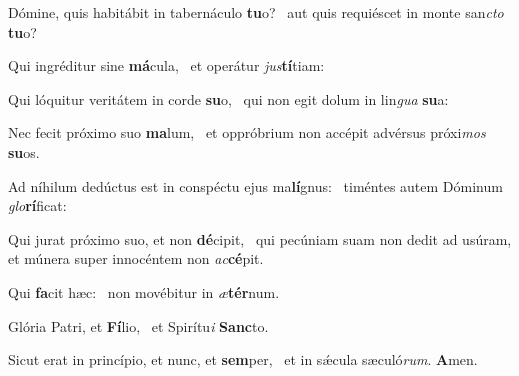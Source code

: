 \item Dómine, quis habitábit in tabernáculo \textbf{tu}o?~\psstar{} aut quis requiéscet in monte san\textit{cto} \textbf{tu}o?
\item Qui ingréditur sine \textbf{má}cula,~\psstar{} et operátur \textit{jus}\textbf{tí}tiam:
\item Qui lóquitur veritátem in corde \textbf{su}o,~\psstar{} qui non egit dolum in lin\textit{gua} \textbf{su}a:
\item Nec fecit próximo suo \textbf{ma}lum,~\psstar{} et oppróbrium non accépit advérsus próxi\textit{mos} \textbf{su}os.
\item Ad níhilum dedúctus est in conspéctu ejus ma\textbf{lí}gnus:~\psstar{} timéntes autem Dóminum \textit{glo}\textbf{rí}ficat:
\item Qui jurat próximo suo, et non \textbf{dé}cipit,~\psstar{} qui pecúniam suam non dedit ad usúram, et múnera super innocéntem non \textit{ac}\textbf{cé}pit.
\item Qui \textbf{fa}cit hæc:~\psstar{} non movébitur in \textit{æ}\textbf{tér}num.
\item Glória Patri, et \textbf{Fí}lio,~\psstar{} et Spirítu\textit{i} \textbf{Sanc}to.
\item Sicut erat in princípio, et nunc, et \textbf{sem}per,~\psstar{} et in sǽcula sæculó\textit{rum}. \textbf{A}men.
